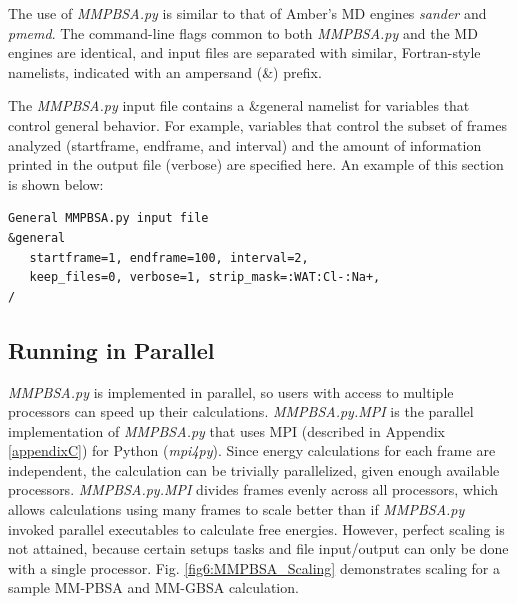 The use of \emph{MMPBSA.py} is similar to that of Amber's MD engines
\emph{sander} and \emph{pmemd}. The command-line flags common to both
\emph{MMPBSA.py} and the MD engines are identical, and input files are separated
with similar, Fortran-style namelists, indicated with an ampersand (\&) prefix.

The \emph{MMPBSA.py} input file contains a &general namelist for variables that
control general behavior. For example, variables that control the subset of
frames analyzed (startframe, endframe, and interval) and the amount of
information printed in the output file (verbose) are specified here. An example
of this section is shown below:
\begin{verbatim}
General MMPBSA.py input file
&general
   startframe=1, endframe=100, interval=2,
   keep_files=0, verbose=1, strip_mask=:WAT:Cl-:Na+,
/
\end{verbatim}

\subsection{Running in Parallel}

\emph{MMPBSA.py} is implemented in parallel, so users with access to multiple
processors can speed up their calculations. \emph{MMPBSA.py.MPI} is the parallel
implementation of \emph{MMPBSA.py} that uses MPI (described in Appendix
\ref{appendixC}) for Python (\emph{mpi4py}). Since energy calculations for each
frame are independent, the calculation can be trivially parallelized, given
enough available processors. \emph{MMPBSA.py.MPI} divides frames evenly across
all processors, which allows calculations using many frames to scale better than
if \emph{MMPBSA.py} invoked parallel executables to calculate free energies.
However, perfect scaling is not attained, because certain setups tasks and file
input/output can only be done with a single processor. Fig.
\ref{fig6:MMPBSA_Scaling} demonstrates scaling for a sample MM-PBSA and MM-GBSA
calculation.

